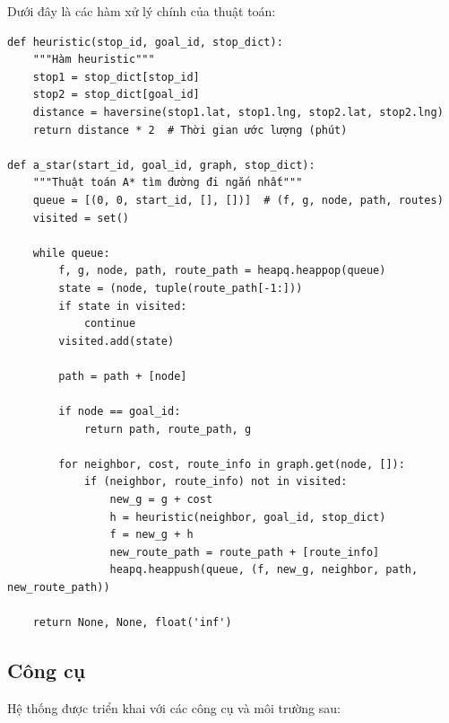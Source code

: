 \documentclass[a4paper,12pt]{article}
\begin{document}
Dưới đây là các hàm xử lý chính của thuật toán:

\begin{verbatim}
def heuristic(stop_id, goal_id, stop_dict):
    """Hàm heuristic"""
    stop1 = stop_dict[stop_id]
    stop2 = stop_dict[goal_id]
    distance = haversine(stop1.lat, stop1.lng, stop2.lat, stop2.lng)
    return distance * 2  # Thời gian ước lượng (phút)

def a_star(start_id, goal_id, graph, stop_dict):
    """Thuật toán A* tìm đường đi ngắn nhất"""
    queue = [(0, 0, start_id, [], [])]  # (f, g, node, path, routes)
    visited = set()
    
    while queue:
        f, g, node, path, route_path = heapq.heappop(queue)
        state = (node, tuple(route_path[-1:]))
        if state in visited:
            continue
        visited.add(state)
        
        path = path + [node]
        
        if node == goal_id:
            return path, route_path, g
        
        for neighbor, cost, route_info in graph.get(node, []):
            if (neighbor, route_info) not in visited:
                new_g = g + cost
                h = heuristic(neighbor, goal_id, stop_dict)
                f = new_g + h
                new_route_path = route_path + [route_info]
                heapq.heappush(queue, (f, new_g, neighbor, path, new_route_path))
    
    return None, None, float('inf')
\end{verbatim}

\subsection{Công cụ}

Hệ thống được triển khai với các công cụ và môi trường sau:
\end{document}

